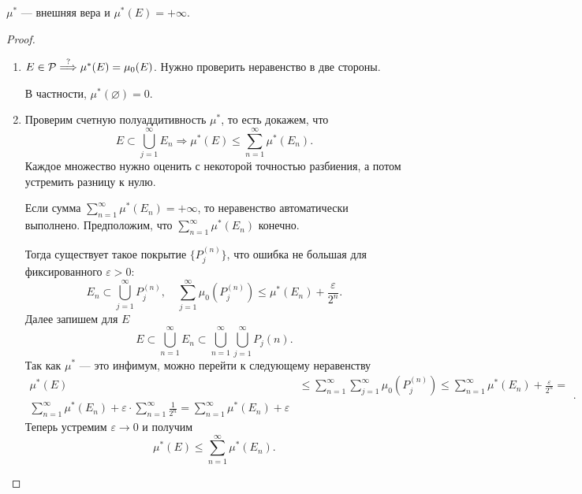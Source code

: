 \begin{thm}
	$ \mu ^{*}$ --- внешняя вера и  $ \mu ^{*}(E) = +\infty$.
\end{thm}
\begin{proof}
	$ $
    \begin{enumerate}
		\item $ E \in \P \stackrel{?}{ \Longrightarrow } \mu ^{*} (E) = \mu _0(E)$. Нужно проверить неравенство в две стороны.
			$ $
			В частности, $ \mu ^{*}(\varnothing) = 0$.
		\item Проверим счетную полуаддитивность $ \mu ^{*}$, то есть докажем, что
			\[
				E \subset \bigcup_{j=1}^{\infty} E_n \Longrightarrow \mu ^{*}(E)  \le \sum_{n=1}^{\infty} \mu ^{*}(E_n)
			.\] 
			Каждое множество нужно оценить с некоторой точностью разбиения, а потом устремить разницу к нулю.

			Если сумма $ \sum_{n=1}^{\infty} \mu ^{*}(E_n) = +\infty$, то неравенство автоматически выполнено. Предположим, что $ \sum_{n=1}^{\infty} \mu ^{*}(E_n) $ конечно.

			Тогда существует такое покрытие $ \{P_j^{(n)}\}$, что ошибка не большая для фиксированного $ \varepsilon > 0$:
			\[
				E_n \subset \bigcup_{j=1}^{\infty} P_j^{(n)}, \quad \sum_{j=1}^{\infty} \mu _0(P_{j}^{(n)}) \le \mu ^{*} (E_n) + \frac{\varepsilon }{2^{n}}
			.\] 
			Далее запишем для $ E$ 
			\[
				E \subset \bigcup_{n=1}^{\infty} E_n \subset \bigcup_{n=1}^{\infty} \bigcup_{j=1}^{\infty} P_j(n)
			.\] 
			Так как $ \mu ^{*}$ --- это инфимум, можно перейти к следующему неравенству
			\[
				\begin{aligned}
					\mu ^{*} (E) &\le \sum_{n=1}^{\infty} \sum_{j=1}^{\infty} \mu _{0}(P_j^{(n)}) \le \sum_{n=1}^{\infty} \mu ^{*}(E_n) + \frac{\varepsilon}{2^{n}} = \\
					\sum_{n=1}^{\infty} \mu ^{*}(E_n) + \varepsilon \cdot \sum_{n=1}^{\infty} \frac{1}{2^{n}} = \sum_{n=1}^{\infty} \mu ^{*}(E_n) + \varepsilon 
				\end{aligned}
			.\] 
			Теперь устремим $ \varepsilon \to  0$ и получим
			\[
				\mu ^{*} (E) \le \sum_{n=1}^{\infty} \mu ^{*}(E_n)
			.\] 
    \end{enumerate} 
\end{proof}

